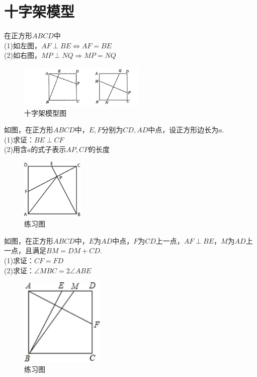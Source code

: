 \documentclass{ecnuthesis}
\begin{document}
\section{十字架模型}
\begin{model}
    在正方形$ABCD$中 \\
    (1)如左图，$AF\perp BE \Leftrightarrow AF=BE$ \\
    (2)如右图，$MP\perp NQ \Rightarrow MP=NQ$
\end{model}
\begin{figure}[H]
\centering
\includegraphics[width=6cm]{picture/6100.png}
\caption{十字架模型图}
\end{figure}
\begin{problem}
    如图，在正方形$ABCD$中，$E,F$分别为$CD,AD$中点，设正方形边长为$a$. \\
    (1)求证：$BE\perp CF$ \\
    (2)用含$a$的式子表示$AP,CP$的长度
\end{problem}
\begin{figure}[H]
\centering
\includegraphics[width=3cm]{picture/6101.png}
\caption{练习图}
\end{figure}
\begin{problem}
    如图，在正方形$ABCD$中，$E$为$AD$中点，$F$为$CD$上一点，$AF\perp BE$，$M$为$AD$上一点，且满足$BM=DM+CD$. \\
    (1)求证：$CF=FD$ \\
    (2)求证：$\angle MBC=2\angle ABE$
\end{problem}
\begin{figure}[H]
\centering
\includegraphics[width=4cm]{picture/6102.png}
\caption{练习图}
\end{figure}
\end{document}
